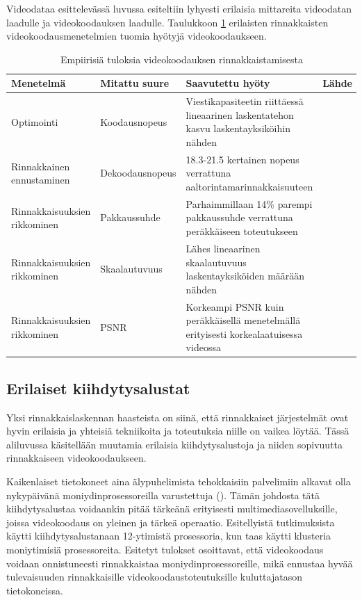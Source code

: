 Videodataa esittelevässä luvussa esiteltiin lyhyesti erilaisia mittareita videodatan
laadulle ja videokoodauksen laadulle. Taulukkoon \ref{tab:results}
erilaisten rinnakkaisten videokoodausmenetelmien tuomia hyötyjä
videokoodaukseen.
\begin{longtable}{| p{} | p{}| p{}| p{}|}

	\caption{Empiirisiä tuloksia videokoodauksen rinnakkaistamisesta}
	\label{tab:results}\\
	\hline
	Menetelmä & Mitattu suure & Saavutettu hyöty & Lähde \\
	\hline\hline
	Optimointi & Koodausnopeus & Viestikapasiteetin riittäessä lineaarinen laskentatehon kasvu laskentayksiköihin nähden &
			\citealt{li} \\
	\hline
	Rinnakkainen ennustaminen & Dekoodausnopeus &
			18.3-21.5 kertainen nopeus verrattuna aaltorintamarinnakkaisuuteen & \citealt{pieters} \\
	\hline
	Rinnakkaisuuksien rikkominen & Pakkaussuhde & Parhaimmillaan 14\% parempi pakkaussuhde verrattuna
			peräkkäiseen toteutukseen & \citealt{xu} \\
	\hline
	Rinnakkaisuuksien rikkominen & Skaalautuvuus & Lähes lineaarinen skaalautuvuus laskentayksiköiden määrään nähden &
			\citealt{xu} \\
	\hline
	Rinnakkaisuuksien rikkominen & PSNR & Korkeampi PSNR kuin peräkkäisellä menetelmällä erityisesti korkealaatuisessa videossa &
			\citealt{xu} \\
	\hline 
\end{longtable}
\subsection{Erilaiset kiihdytysalustat}

Yksi rinnakkaislaskennan haasteista on siinä, että rinnakkaiset järjestelmät
ovat hyvin erilaisia ja yhteisiä tekniikoita ja toteutuksia niille on vaikea
löytää. Tässä aliluvussa käsitellään muutamia erilaisia kiihdytysalustoja ja
niiden sopivuutta rinnakkaiseen videokoodaukseen.

Kaikenlaiset tietokoneet aina älypuhelimista tehokkaisiin palvelimiin alkavat
olla nykypäivänä moniydinprosessoreilla varustettuja (\citealt{choi}). Tämän
johdosta tätä kiihdytysalustaa voidaankin pitää tärkeänä erityisesti
multimediasovelluksille, joissa videokoodaus on yleinen ja tärkeä operaatio.
Esitellyistä tutkimuksista \citealt{chi} käytti kiihdytysalustanaan 12-ytimistä
prosessoria, kun taas \citealt{li} käytti klusteria moniytimisiä prosessoreita.
Esitetyt tulokset osoittavat, että videokoodaus voidaan onnistuneesti
rinnakkaistaa moniydinprosessoreille, mikä ennustaa hyvää tulevaisuuden
rinnakkaisille videokoodaustoteutuksille kuluttajatason tietokoneissa.

